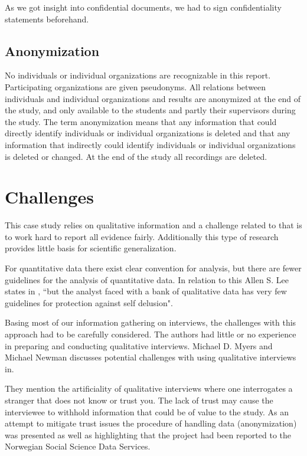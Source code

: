 As we got insight into confidential documents, we had to sign confidentiality statements beforehand.


\subsection{Anonymization}
No individuals or individual organizations are recognizable in this report. Participating organizations are given pseudonyms. All relations between individuals and individual organizations and results are anonymized at the end of the study, and only available to the students and partly their supervisors during the study. The term anonymization means that any information that could directly identify individuals or individual organizations is deleted and that any information that indirectly could identify individuals or individual organizations is deleted or changed. At the end of the study all recordings are deleted.

\section{Challenges}
This case study relies on qualitative information and a challenge related to that is to work hard to report all evidence fairly. Additionally this type of research provides little basis for scientific generalization. \cite{CaseStudyResearch}

For quantitative data there exist clear convention for analysis, but there are fewer guidelines for the analysis of quantitative data. In relation to this Allen S. Lee states in \cite{lee1989scientific}, ``but the analyst faced with a bank of qualitative data has very few guidelines for protection against self delusion".

Basing most of our information gathering on interviews, the challenges with this approach had to be carefully considered. The authors had little or no experience in preparing and conducting qualitative interviews. Michael D. Myers and Michael Newman discusses potential challenges with using qualitative interviews in\cite{myers2007qualitative}. 

They mention the artificiality of qualitative interviews where one interrogates a stranger that does not know or trust you. The lack of trust may cause the interviewee to withhold information that could be of value to the study. As an attempt to mitigate trust issues the procedure of handling data (anonymization) was presented as well as highlighting that the project had been reported to the Norwegian Social Science Data Services.   

